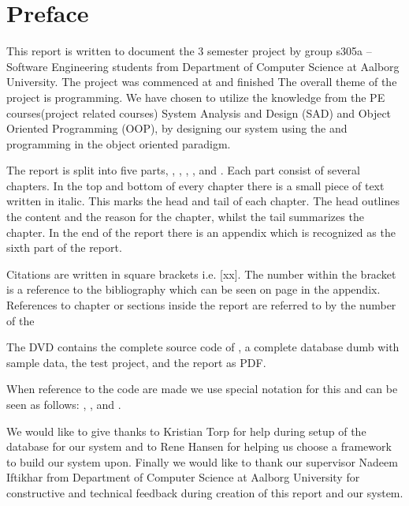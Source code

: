 \chapter*{Preface}
\label{chap:preface}
%
\emptyTop{}%
\vspace{-15mm}%
This report is written to document the 3\rd{} semester project by group s305a -- Software Engineering students from Department of Computer Science at Aalborg University. 
The project was commenced at  and finished 
The overall theme of the project is programming. 
We have chosen to utilize the knowledge from the PE courses(project related courses) System Analysis and Design (SAD) and Object Oriented Programming (OOP), by designing our system using the \ooad and programming \hdesk[] in the object oriented paradigm.  

The report is split into five parts, , , , , and . Each part consist of several chapters. In the top and bottom of every chapter there is a small piece of text written in italic. This marks the head and tail of each chapter. The head outlines the content and the reason for the chapter, whilst the tail summarizes the chapter.
In the end of the report there is an appendix which is recognized as the sixth part of the report.

Citations are written in square brackets i.e. [xx]. The number within the bracket is a reference to the bibliography which can be seen on page \pageref{chap:bib} in the appendix.
References to chapter or sections inside the report are referred to by the number of the 

The DVD contains the complete source code of \hdesk[], a complete database dumb with sample data, the test project, and the report as PDF.  

When reference to the code are made we use special notation for this and can be seen as follows: , ,  and .

We would like to give thanks to Kristian Torp for help during setup of the database for our system and to Rene Hansen for helping us choose a framework to build our system upon.
Finally we would like to thank our supervisor Nadeem Iftikhar from Department of Computer Science at Aalborg University for constructive and technical feedback during creation of this report and our system.